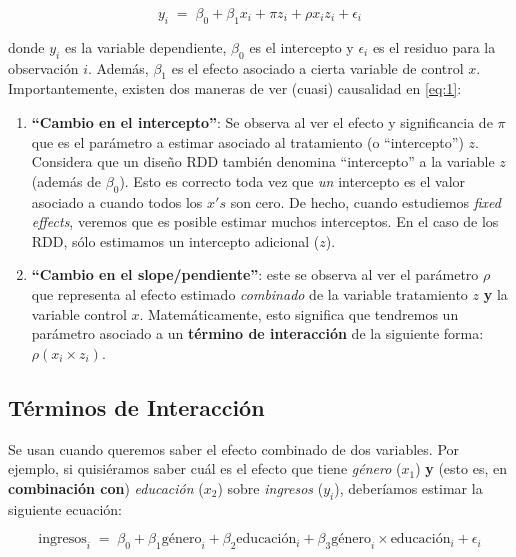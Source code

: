 \documentclass[10pt]{article}
\begin{document}
\begin{equation}\label{eq:1}
y_{i} \;=\; \beta_{0} + \beta_{1}x_{i} + \pi z_{i} + \rho x_{i}z_{i} + \epsilon_{i}
\end{equation}

donde $y_{i}$ es la variable dependiente, $\beta_{0}$ es el intercepto y $\epsilon_{i}$ es el residuo para la observaci\'on $i$. Adem\'as, $\beta_{1}$ es el efecto asociado a cierta variable de control $x$. Importantemente, existen dos maneras de ver (cuasi) causalidad en \autoref{eq:1}:

\begin{enumerate}
	\item {\bf ``Cambio en el intercepto''}: Se observa al ver el efecto y significancia de $\pi$ que es el par\'ametro a estimar asociado al tratamiento (o ``intercepto'') $z$. Considera que un dise\~no RDD tambi\'en denomina ``intercepto'' a la variable $z$ (adem\'as de $\beta_{0}$). Esto es correcto toda vez que \emph{un} intercepto es el valor asociado a cuando todos los $x's $ son cero. De hecho, cuando estudiemos \emph{fixed effects}, veremos que es posible estimar muchos interceptos. En el caso de los RDD, s\'olo estimamos un intercepto adicional ($z$).

	\item  {\bf ``Cambio en el slope/pendiente''}: este se observa al ver el par\'ametro $\rho$ que representa al efecto estimado \emph{combinado} de la variable tratamiento $z$ {\bf y} la variable control $x$. Matem\'aticamente, esto significa que tendremos un par\'ametro asociado a un {\bf t\'ermino de interacci\'on} de la siguiente forma: $\rho(x_{i}\times z_{i})$. 
\end{enumerate}

\subsection*{T\'erminos de Interacci\'on}

Se usan cuando queremos saber el efecto combinado de dos variables. Por ejemplo, si quisi\'eramos saber cu\'al es el efecto que tiene \emph{g\'enero} ($x_{1}$) {\bf y} (esto es, en {\bf combinaci\'on con}) \emph{educaci\'on} ($x_{2}$) sobre \emph{ingresos} ($y_{i}$), deber\'iamos estimar la siguiente ecuaci\'on:

		\begin{equation}\label{eq:int:term}
			\text{ingresos}_{i} \;=\; \beta_{0} + \beta_{1}\text{g\'enero}_{i} + \beta_{2}\text{educaci\'on}_{i} + \beta_{3}{\text{g\'enero}}_{i}\times \text{educaci\'on}_{i} + \epsilon_{i}
		\end{equation}
\end{document}
